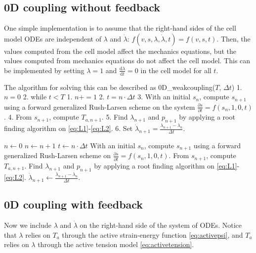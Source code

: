 \subsection{0D coupling without
feedback}\label{d-coupling-without-feedback}

One simple implementation is to assume that the right-hand sides of the
cell model ODEs are independent of \(\lambda\) and \(\dot{\lambda}\):
\(f(v,s,\lambda,\dot{\lambda},t)=f(v,s,t)\). Then, the values computed
from the cell model affect the mechanics equations, but the values
computed from mechanics equations do not affect the cell model. This can
be implemented by setting \(\lambda=1\) and
\(\frac{\text{d}\lambda}{\text{d}t}=0\) in the cell model for all \(t\).

The algorithm for solving this can be described as
0D\_weakcoupling(\(T\), \(\Delta t\)) 1. \(n=0\) 2. while \(t<T\) 1.
\(n+=1\) 2. \(t=n\cdot \Delta t\) 3. With an initial \(s_{n}\), compute
\(s_{n+1}\) using a forward generalized Rush-Larsen scheme on the system
\(\frac{ \partial s }{ \partial t }=f(s_{n},1,0,t)\). 4. From
\(s_{n+1}\), compute \(T_{a,n+1}\). 5. Find \(\lambda_{n+1}\) and
\(p_{n+1}\) by applying a root finding algorithm on
\eqref{eq:L1}-\eqref{eq:L2}. 6. Set
\(\dot{\lambda}_{n+1}=\frac{\lambda_{n+1}-\lambda_{n}}{\Delta t}\).

\begin{algorithm}
\caption{$0D\_weakcoupling(T, \Delta t)$}
\begin{algorithmic}[1]
    \State $n \gets 0$
        \State $n \gets n + 1$
        \State $t \gets n \cdot \Delta t$
        \State With an initial $s_{n}$, compute $s_{n+1}$ using a forward generalized Rush-Larsen scheme on $\frac{ \partial s }{ \partial t }=f(s_{n},1,0,t)$.
        \State From $s_{n+1}$, compute $T_{a,n+1}$.
        \State Find $\lambda_{n+1}$ and $p_{n+1}$ by applying a root finding algorithm on \eqref{eq:L1}-\eqref{eq:L2}.
        \State $\dot{\lambda}_{n+1} \gets \frac{\lambda_{n+1}-\lambda_{n}}{\Delta t}$.
    \EndWhile
\end{algorithmic}
\end{algorithm}

\subsection{0D coupling with feedback}\label{d-coupling-with-feedback}

Now we include \(\lambda\) and \(\dot{\lambda}\) on the right-hand side
of the system of ODEs. Notice that \(\lambda\) relies on \(T_{a}\)
through the active strain-energy function \eqref{eq:activepsi}, and
\(T_{a}\) relies on \(\lambda\) through the active tension model
\eqref{eq:activetension}.

